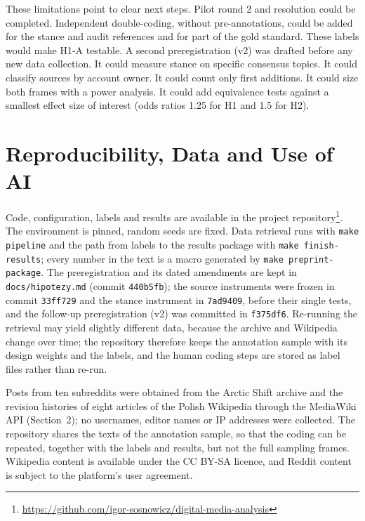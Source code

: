\documentclass[10pt,a4paper]{article}
\newcommand{\kod}[1]{\texttt{#1}}
\begin{document}
These limitations point to clear next steps. Pilot round 2 and resolution could be
completed. Independent double-coding, without pre-annotations, could be added for the
stance and audit references and for part of the gold standard. These labels would make
H1-A testable. A second preregistration (v2) was drafted before any new data collection.
It could measure stance on specific consensus topics. It could classify sources by
account owner. It could count only first additions. It could size both frames with a
power analysis. It could add equivalence tests against a smallest effect size of
interest (odds ratios 1.25 for H1 and 1.5 for H2).

\section{Reproducibility, Data and Use of AI}

Code, configuration, labels and results are available in the project
repository\footnote{\url{https://github.com/igor-sosnowicz/digital-media-analysis}}. The
environment is pinned, random seeds are
fixed. Data retrieval runs with
\kod{make pipeline} and the path from labels to the results package with
\kod{make finish-results}; every number in the text is a macro generated by
\kod{make preprint-package}. The preregistration and its dated amendments are kept in
\kod{docs/hipotezy.md} (commit \kod{440b5fb}); the source instruments were frozen in
commit \kod{33ff729} and the stance instrument in \kod{7ad9409}, before their single
tests, and the follow-up preregistration (v2) was committed in \kod{f375df6}. Re-running
the retrieval may yield slightly different data, because the archive and Wikipedia change
over time; the repository therefore keeps the annotation sample with its design weights
and the labels, and the human coding steps are stored as label files rather than re-run.

Posts from ten subreddits were obtained from the Arctic Shift archive and the revision
histories of eight articles of the Polish Wikipedia through the MediaWiki API
(Section~2); no usernames, editor names or IP addresses were collected.  The repository
shares the texts of the annotation sample, so that the coding can be repeated, together
with the labels and results, but not the full sampling frames. Wikipedia content is
available under the CC BY-SA licence, and Reddit content is subject to the platform's user
agreement.
\end{document}
